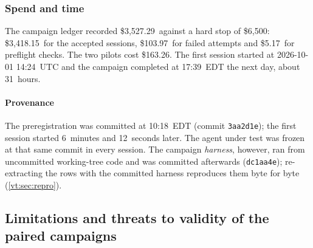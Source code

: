 \documentclass[11pt,letterpaper]{article}
\newcommand{\code}[1]{\texttt{#1}}
\newcommand{\CompleteEDT}{17:39}
\newcommand{\FirstStart}{2026-10-01 14:24}
\newcommand{\HarnessSha}{dc1aa4e}
\newcommand{\NFailedUSD}{103.97}
\newcommand{\PreregGapMin}{6}
\newcommand{\PreregGapSec}{12}
\newcommand{\PreregSha}{3aa2d1e}
\newcommand{\PreregTime}{10:18}
\newcommand{\SpendBudget}{6{,}500}
\newcommand{\SpendLedger}{3{,}527.29}
\newcommand{\SpendPilots}{163.26}
\newcommand{\SpendPreflight}{5.17}
\newcommand{\SpendSessions}{3{,}418.15}
\newcommand{\WallHours}{31}
\begin{document}
\subsubsection{Spend and time}

The campaign ledger recorded \$\SpendLedger\ against a hard stop of \$\SpendBudget: \$\SpendSessions\ for
the accepted sessions, \$\NFailedUSD\ for failed attempts and \$\SpendPreflight\ for preflight checks. The
two pilots cost \$\SpendPilots. The first session started at \FirstStart\ UTC and the campaign completed at
\CompleteEDT\ EDT the next day, about \WallHours\ hours.

\paragraph{Provenance} The preregistration was committed at \PreregTime\ EDT (commit \code{\PreregSha});
the first session started \PreregGapMin\ minutes and \PreregGapSec\ seconds later. The agent under test was
frozen at that same commit in every session. The campaign \emph{harness}, however, ran from uncommitted
working-tree code and was committed afterwards (\code{\HarnessSha}); re-extracting the rows with the
committed harness reproduces them byte for byte (\cref{vt:sec:repro}).
\subsection{Limitations and threats to validity of the paired campaigns}\label{vt:sec:limits}
\end{document}
